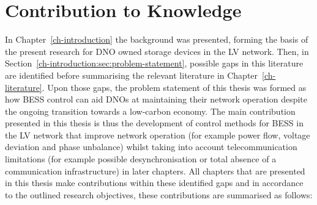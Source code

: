 \section{Contribution to Knowledge}
\label{ch-conclusions:sec:knowledge-contribution}

In Chapter~\ref{ch-introduction} the background was presented, forming the basis of the present research for DNO owned storage devices in the LV network.
Then, in Section~\ref{ch-introduction:sec:problem-statement}, possible gaps in this literature are identified before summarising the relevant literature in Chapter~\ref{ch-literature}.
Upon those gaps, the problem statement of this thesis was formed as how BESS control can aid DNOs at maintaining their network operation despite the ongoing transition towards a low-carbon economy.
The main contribution presented in this thesis is thus the development of control methods for BESS in the LV network that improve network operation (for example power flow, voltage deviation and phase unbalance) whilst taking into account telecommunication limitations (for example possible desynchronisation or total absence of a communication infrastructure) in later chapters.
All chapters that are presented in this thesis make contributions within these identified gaps and in accordance to the outlined research objectives, these contributions are summarised as follows:

